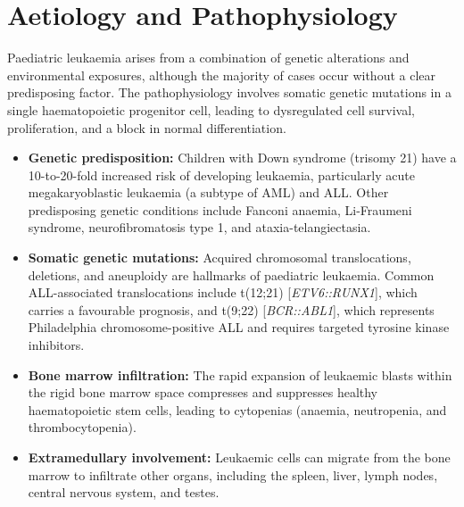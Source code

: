 \section*{Aetiology and Pathophysiology}
Paediatric leukaemia arises from a combination of genetic alterations and environmental exposures, although the majority of cases occur without a clear predisposing factor. The pathophysiology involves somatic genetic mutations in a single haematopoietic progenitor cell, leading to dysregulated cell survival, proliferation, and a block in normal differentiation.
\begin{itemize}
    \item \textbf{Genetic predisposition:} Children with Down syndrome (trisomy 21) have a 10-to-20-fold increased risk of developing leukaemia, particularly acute megakaryoblastic leukaemia (a subtype of AML) and ALL. Other predisposing genetic conditions include Fanconi anaemia, Li-Fraumeni syndrome, neurofibromatosis type 1, and ataxia-telangiectasia.
    \item \textbf{Somatic genetic mutations:} Acquired chromosomal translocations, deletions, and aneuploidy are hallmarks of paediatric leukaemia. Common ALL-associated translocations include t(12;21) [\textit{ETV6::RUNX1}], which carries a favourable prognosis, and t(9;22) [\textit{BCR::ABL1}], which represents Philadelphia chromosome-positive ALL and requires targeted tyrosine kinase inhibitors.
    \item \textbf{Bone marrow infiltration:} The rapid expansion of leukaemic blasts within the rigid bone marrow space compresses and suppresses healthy haematopoietic stem cells, leading to cytopenias (anaemia, neutropenia, and thrombocytopenia).
    \item \textbf{Extramedullary involvement:} Leukaemic cells can migrate from the bone marrow to infiltrate other organs, including the spleen, liver, lymph nodes, central nervous system, and testes.
\end{itemize}

